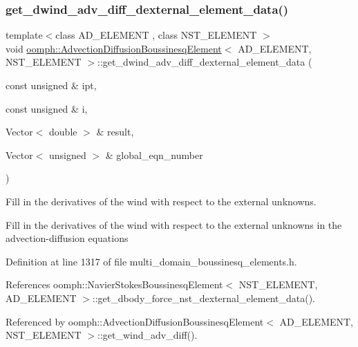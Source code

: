 \subsubsection{\texorpdfstring{get\+\_\+dwind\+\_\+adv\+\_\+diff\+\_\+dexternal\+\_\+element\+\_\+data()}{get\_dwind\_adv\_diff\_dexternal\_element\_data()}}
{\footnotesize\ttfamily template$<$class A\+D\+\_\+\+E\+L\+E\+M\+E\+NT , class N\+S\+T\+\_\+\+E\+L\+E\+M\+E\+NT $>$ \\
void \hyperlink{classoomph_1_1AdvectionDiffusionBoussinesqElement}{oomph\+::\+Advection\+Diffusion\+Boussinesq\+Element}$<$ A\+D\+\_\+\+E\+L\+E\+M\+E\+NT, N\+S\+T\+\_\+\+E\+L\+E\+M\+E\+NT $>$\+::get\+\_\+dwind\+\_\+adv\+\_\+diff\+\_\+dexternal\+\_\+element\+\_\+data (\begin{DoxyParamCaption}\item[{const unsigned \&}]{ipt,  }\item[{const unsigned \&}]{i,  }\item[{Vector$<$ double $>$ \&}]{result,  }\item[{Vector$<$ unsigned $>$ \&}]{global\+\_\+eqn\+\_\+number }\end{DoxyParamCaption})}



Fill in the derivatives of the wind with respect to the external unknowns. 

Fill in the derivatives of the wind with respect to the external unknowns in the advection-\/diffusion equations 

Definition at line 1317 of file multi\+\_\+domain\+\_\+boussinesq\+\_\+elements.\+h.



References oomph\+::\+Navier\+Stokes\+Boussinesq\+Element$<$ N\+S\+T\+\_\+\+E\+L\+E\+M\+E\+N\+T, A\+D\+\_\+\+E\+L\+E\+M\+E\+N\+T $>$\+::get\+\_\+dbody\+\_\+force\+\_\+nst\+\_\+dexternal\+\_\+element\+\_\+data().



Referenced by oomph\+::\+Advection\+Diffusion\+Boussinesq\+Element$<$ A\+D\+\_\+\+E\+L\+E\+M\+E\+N\+T, N\+S\+T\+\_\+\+E\+L\+E\+M\+E\+N\+T $>$\+::get\+\_\+wind\+\_\+adv\+\_\+diff().

\mbox{\label{classoomph_1_1AdvectionDiffusionBoussinesqElement_a86ec5858acc0a562cee7bccedfecb252}} 
